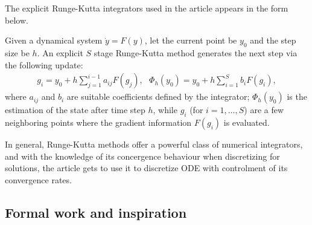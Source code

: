 The explicit Runge-Kutta integrators used in the article appears in the form below.

\begin{definition}
  Given a dynamical system $\dot{y} = F(y)$, let the current point be $y_{0}$ and the step size be $h$. An explicit $S$ stage Runge-Kutta method generates the next step via the following update:
  \begin{align}\label{def_1}
    g_{i} = y_{0} + h \sum\limits_{j=1}^{i-1} a_{ij}F(g_{j}),\ \ \ \Phi_{h}(y_{0}) = y_{0}
    + h \sum\limits_{i=1}^{S} b_{i}F(g_{i}),
  \end{align}
  where $a_{ij}$ and $b_{i}$ are suitable coefficients defined by the integrator; $\Phi_{h}(y_{0})$ is the estimation of the state after time step $h$, while $g_i$ (for $i = 1,\ldots,S$) are a few neighboring points where the gradient information $F(g_i)$ is evaluated.
\end{definition}

In general, Runge-Kutta methods offer a powerful class of numerical integrators, and with the knowledge
of its concergence behaviour when discretizing for solutions, the article gets to use it
to discretize ODE with controlment of its convergence rates.

\subsection{Formal work and inspiration}

